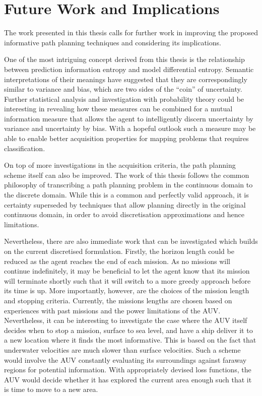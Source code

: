 	
	\section{Future Work and Implications}
	
		The work presented in this thesis calls for further work in improving the proposed informative path planning techniques and considering its implications.
		
		One of the most intriguing concept derived from this thesis is the relationship between prediction information entropy and model differential entropy. Semantic interpretations of their meanings have suggested that they are correspondingly similar to variance and bias, which are two sides of the ``coin'' of uncertainty. Further statistical analysis and investigation with probability theory could be interesting in revealing how these measures can be combined for a mutual information measure that allows the agent to intelligently discern uncertainty by variance and uncertainty by bias. With a hopeful outlook such a measure may be able to enable better acquisition properties for mapping problems that requires classification.
		
		On top of more investigations in the acquisition criteria, the path planning scheme itself can also be improved. The work of this thesis follows the common philosophy of transcribing a path planning problem in the continuous domain to the discrete domain. While this is a common and perfectly valid approach, it is certainty superseded by techniques that allow planning directly in the original continuous domain, in order to avoid discretisation approximations and hence limitations. 
		
		Nevertheless, there are also immediate work that can be investigated which builds on the current discretised formulation. Firstly, the horizon length could be reduced as the agent reaches the end of each mission. As no missions will continue indefinitely, it may be beneficial to let the agent know that its mission will terminate shortly such that it will switch to a more greedy approach before its time is up. More importantly, however, are the choices of the mission length and stopping criteria. Currently, the missions lengths are chosen based on experiences with past missions and the power limitations of the AUV. Nevertheless, it can be interesting to investigate the case where the AUV itself decides when to stop a mission, surface to sea level, and have a ship deliver it to a new location where it finds the most informative. This is based on the fact that underwater velocities are much slower than surface velocities. Such a scheme would involve the AUV constantly evaluating its surroundings against faraway regions for potential information. With appropriately devised loss functions, the AUV would decide whether it has explored the current area enough such that it is time to move to a new area.
			
